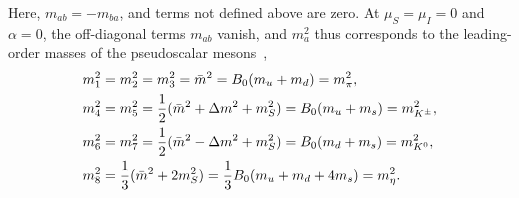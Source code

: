 %
Here, $m_{ab} = -m_{ba}$, and terms not defined above are zero.
At $\mu_S = \mu_I = 0$ and $\alpha = 0$, the off-diagonal terms $m_{ab}$ vanish, and $m_a^2$ thus corresponds to the leading-order masses of the pseudoscalar mesons~\autocite{eckerChiralPerturbationTheory1995},
%
\begin{align}
    m_1^2 & = m_2^2 = m_3^2 
    = \bar m^2 
    = B_0(m_u + m_d) = m_\pi^2, \\
    m_4^2 & = m_5^2 
    = \frac{1}{2} (\bar m^2 + \Delta m^2 + m_S^2) 
    = B_0(m_u + m_s) = m_{{K^\pm}}^2, \\
    m_6^2 &= m_7^2 
    = \frac{1}{2} (\bar m^2 - \Delta m^2 + m_S^2) 
    = B_0(m_d + m_s) = m_{{K^0} }^2, \\
    m_8^2 
    &= \frac{1}{3}(\bar m^2  + 2m_S^2) 
    = \frac{1}{3}B_0(m_u + m_d + 4m_s) = m_\eta^2 .
\end{align}
%

